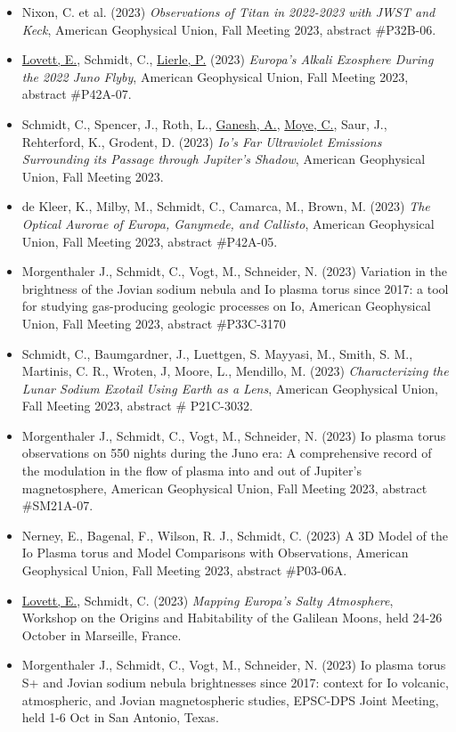 \documentclass[12pt]{report}
\begin{document}
\begin{itemize}
   \item Nixon, C. et al. (2023) \textit{Observations of Titan in 2022-2023 with JWST and Keck}, American Geophysical Union, Fall Meeting 2023, abstract \#P32B-06.
   \item \underline{Lovett, E.}, Schmidt, C., \underline{Lierle, P.} (2023) \textit{Europa's Alkali Exosphere During the 2022 Juno Flyby}, American Geophysical Union, Fall Meeting 2023, abstract \#P42A-07.
   \item Schmidt, C., Spencer, J., Roth, L., \underline{Ganesh, A.}, \underline{Moye, C.}, Saur, J., Rehterford, K., Grodent, D. (2023) \textit{Io's Far Ultraviolet Emissions Surrounding its Passage through Jupiter's Shadow}, American Geophysical Union, Fall Meeting 2023.
   \item de Kleer, K., Milby, M., Schmidt, C., Camarca, M., Brown, M. (2023) \textit{The Optical Aurorae of Europa, Ganymede, and Callisto}, American Geophysical Union, Fall Meeting 2023, abstract \#P42A-05.
   \item Morgenthaler J., Schmidt, C., Vogt, M., Schneider, N. (2023) Variation in the brightness of the Jovian sodium nebula and Io plasma torus since 2017: a tool for studying gas-producing geologic processes on Io, American Geophysical Union, Fall Meeting 2023, abstract \#P33C-3170
   \item Schmidt, C., Baumgardner, J., Luettgen, S. Mayyasi, M., Smith, S. M., Martinis, C. R., Wroten, J, Moore, L., Mendillo, M. (2023) \textit{Characterizing the Lunar Sodium Exotail Using Earth as a Lens}, American Geophysical Union, Fall Meeting 2023, abstract \# P21C-3032.
   \item Morgenthaler J., Schmidt, C., Vogt, M., Schneider, N. (2023) Io plasma torus observations on 550 nights during the Juno era: A comprehensive record of the modulation in the flow of plasma into and out of Jupiter's magnetosphere, American Geophysical Union, Fall Meeting 2023, abstract \#SM21A-07.
   \item Nerney, E., Bagenal, F., Wilson, R. J., Schmidt, C. (2023) A 3D Model of the Io Plasma torus and Model Comparisons with Observations, American Geophysical Union, Fall Meeting 2023, abstract \#P03-06A. 
   \item \underline{Lovett, E.}, Schmidt, C. (2023) \textit{Mapping Europa's Salty Atmosphere}, Workshop on the Origins and Habitability of the Galilean Moons, held 24-26 October in Marseille, France.
   \item Morgenthaler J., Schmidt, C., Vogt, M., Schneider, N. (2023) Io plasma torus S+ and Jovian sodium nebula brightnesses since 2017: context for Io volcanic, atmospheric, and Jovian magnetospheric studies, EPSC-DPS Joint Meeting, held 1-6 Oct in San Antonio, Texas.	

\end{itemize}
\end{document}
